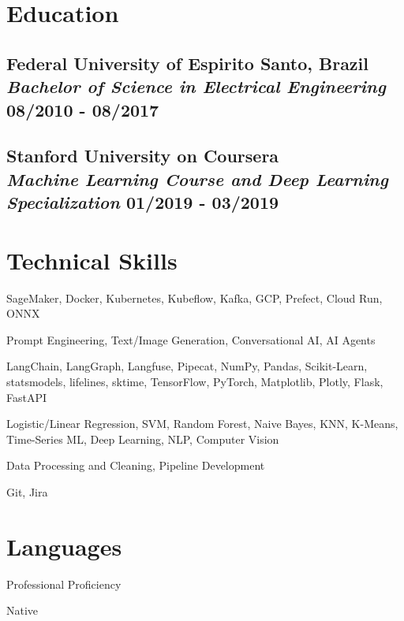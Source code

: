 \documentclass[11pt]{article} %
\begin{document}
\section{Education}
\subsection{Federal University of Espirito Santo, Brazil \\ {\normalfont\itshape Bachelor of Science in Electrical Engineering} \hfill 08/2010 - 08/2017}

\vspace{0.3cm} %

\subsection{Stanford University on Coursera \\ {\normalfont\itshape Machine Learning Course and Deep Learning Specialization} \hfill 01/2019 - 03/2019}

\vspace{0.3cm} %

\section{Technical Skills}
\begin{description}[itemsep=0pt]
	\item[MLOps:] SageMaker, Docker, Kubernetes, Kubeflow, Kafka, GCP, Prefect, Cloud Run, ONNX
	\item[AI/LLM:] Prompt Engineering, Text/Image Generation, Conversational AI, AI Agents
	\item[Python:] LangChain, LangGraph, Langfuse, Pipecat, NumPy, Pandas, Scikit-Learn,\\ statsmodels, lifelines, sktime, TensorFlow, PyTorch, Matplotlib, Plotly, Flask, FastAPI
	\item[Machine Learning:] Logistic/Linear Regression, SVM, Random Forest, Naive Bayes, KNN, K-Means, Time-Series ML, Deep Learning, NLP, Computer Vision
	\item[Data Engineering:] Data Processing and Cleaning, Pipeline Development
	\item[Tools:] Git, Jira
\end{description}

\section{Languages}
\begin{description}[itemsep=0pt]
	\item[English] Professional Proficiency
	\item[Portuguese] Native
\end{description}
\end{document}
